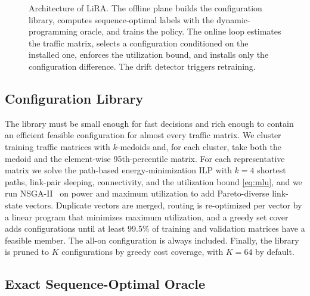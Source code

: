 \documentclass[journal]{IEEEtran}
\begin{document}
\begin{figure}[t]
{}
\caption{Architecture of LiRA. The offline plane builds the configuration library, computes sequence-optimal labels with the dynamic-programming oracle, and trains the policy. The online loop estimates the traffic matrix, selects a configuration conditioned on the installed one, enforces the utilization bound, and installs only the configuration difference. The drift detector triggers retraining.}
\label{fig:arch}
\end{figure}

\subsection{Configuration Library}\label{sec:library}

The library must be small enough for fast decisions and rich enough to contain an efficient feasible configuration for almost every traffic matrix. We cluster training traffic matrices with $k$-medoids and, for each cluster, take both the medoid and the element-wise 95th-percentile matrix. For each representative matrix we solve the path-based energy-minimization ILP with $k=4$ shortest paths, link-pair sleeping, connectivity, and the utilization bound \eqref{eq:mlu}, and we run NSGA-II~\cite{deb2002nsga2} on power and maximum utilization to add Pareto-diverse link-state vectors. Duplicate vectors are merged, routing is re-optimized per vector by a linear program that minimizes maximum utilization, and a greedy set cover adds configurations until at least 99.5\% of training and validation matrices have a feasible member. The all-on configuration is always included. Finally, the library is pruned to $K$ configurations by greedy cost coverage, with $K=64$ by default.

\subsection{Exact Sequence-Optimal Oracle}
\end{document}
